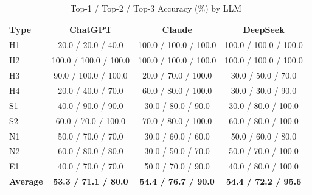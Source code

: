 \begin{table}[ht]
\centering
\footnotesize
\caption{Top-1 / Top-2 / Top-3 Accuracy (\%) by LLM}
\label{tab:acc_llms_singlecol_nocat}
\setlength{\tabcolsep}{2pt}  %
\renewcommand{\arraystretch}{1.05}  %
\begin{tabular}{@{}lccc@{}}
\toprule
\textbf{Type} & \textbf{ChatGPT} & \textbf{Claude} & \textbf{DeepSeek} \\
\midrule
H1 & 20.0  / 20.0  / 40.0  & 100.0 / 100.0 / 100.0 & 100.0 / 100.0 / 100.0 \\
H2 & 100.0 / 100.0 / 100.0 & 100.0 / 100.0 / 100.0 & 100.0 / 100.0 / 100.0 \\
H3 & 90.0  / 100.0 / 100.0 & 20.0  / 70.0  / 100.0 & 30.0  / 50.0  / 70.0  \\
H4 & 20.0  / 40.0  / 70.0  & 60.0  / 80.0  / 100.0 & 30.0  / 30.0  / 90.0  \\
S1 & 40.0  / 90.0  / 90.0  & 30.0  / 80.0  / 90.0  & 30.0  / 80.0  / 100.0 \\
S2 & 60.0  / 70.0  / 100.0 & 70.0  / 80.0  / 100.0 & 60.0  / 80.0  / 100.0 \\
N1 & 50.0  / 70.0  / 70.0  & 30.0  / 60.0  / 60.0  & 50.0  / 60.0  / 80.0  \\
N2 & 60.0  / 80.0  / 80.0  & 30.0  / 50.0  / 70.0  & 50.0  / 70.0  / 100.0 \\
E1 & 40.0  / 70.0  / 70.0  & 50.0  / 70.0  / 90.0  & 40.0  / 80.0  / 100.0 \\
\textbf{Average} 
& \textbf{53.3 / 71.1 / 80.0} 
& \textbf{54.4 / 76.7 / 90.0} 
& \textbf{54.4 / 72.2 / 95.6} \\
\bottomrule
\end{tabular}
\end{table}